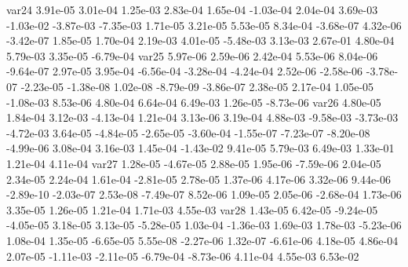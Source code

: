 var24  3.91e-05  3.01e-04  1.25e-03  2.83e-04  1.65e-04 -1.03e-04  2.04e-04  3.69e-03 -1.03e-02 -3.87e-03 -7.35e-03  1.71e-05  3.21e-05  5.53e-05  8.34e-04 -3.68e-07  4.32e-06 -3.42e-07  1.85e-05  1.70e-04  2.19e-03  4.01e-05 -5.48e-03  3.13e-03  2.67e-01  4.80e-04  5.79e-03  3.35e-05 -6.79e-04
var25  5.97e-06  2.59e-06  2.42e-04  5.53e-06  8.04e-06 -9.64e-07  2.97e-05  3.95e-04 -6.56e-04 -3.28e-04 -4.24e-04  2.52e-06 -2.58e-06 -3.78e-07 -2.23e-05 -1.38e-08  1.02e-08 -8.79e-09 -3.86e-07  2.38e-05  2.17e-04  1.05e-05 -1.08e-03  8.53e-06  4.80e-04  6.64e-04  6.49e-03  1.26e-05 -8.73e-06
var26  4.80e-05  1.84e-04  3.12e-03 -4.13e-04  1.21e-04  3.13e-06  3.19e-04  4.88e-03 -9.58e-03 -3.73e-03 -4.72e-03  3.64e-05 -4.84e-05 -2.65e-05 -3.60e-04 -1.55e-07 -7.23e-07 -8.20e-08 -4.99e-06  3.08e-04  3.16e-03  1.45e-04 -1.43e-02  9.41e-05  5.79e-03  6.49e-03  1.33e-01  1.21e-04  4.11e-04
var27  1.28e-05 -4.67e-05  2.88e-05  1.95e-06 -7.59e-06  2.04e-05  2.34e-05  2.24e-04  1.61e-04 -2.81e-05  2.78e-05  1.37e-06  4.17e-06  3.32e-06  9.44e-06 -2.89e-10 -2.03e-07  2.53e-08 -7.49e-07  8.52e-06  1.09e-05  2.05e-06 -2.68e-04  1.73e-06  3.35e-05  1.26e-05  1.21e-04  1.71e-03  4.55e-03
var28  1.43e-05  6.42e-05 -9.24e-05 -4.05e-05  3.18e-05  3.13e-05 -5.28e-05  1.03e-04 -1.36e-03  1.69e-03  1.78e-03 -5.23e-06  1.08e-04  1.35e-05 -6.65e-05  5.55e-08 -2.27e-06  1.32e-07 -6.61e-06  4.18e-05  4.86e-04  2.07e-05 -1.11e-03 -2.11e-05 -6.79e-04 -8.73e-06  4.11e-04  4.55e-03  6.53e-02



